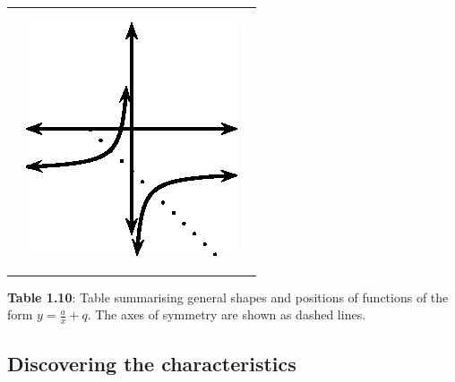\begin{center}
\begin{xtabular*}{\mytablewidth}[t]{|p{10\mystarwidth}|p{10\mystarwidth}|p{10\mystarwidth}|}
\begin{center}
    \end{center}    
                 &
    \setcounter{subfigure}{0}
\label{m39341*id246993}
    \begin{center}
    \label{m39341*id246993!!!underscore!!!media}\label{m39341*id246993!!!underscore!!!printimage}\includegraphics[width=.3\columnwidth]{col11306.imgs/m39341_MG10C11_025.png} %
      \vspace{2pt}
    \vspace{.1in}
    \end{center}    
     \tabularnewline{}
    \end{xtabular*}
      \end{center}
    \begin{center}{\small\bfseries Table 1.10}: Table summarising general shapes and positions of functions of the form $y=\frac{a}{x}+q$. The axes of symmetry are shown as dashed lines.\end{center}
    \par
\subsection{Discovering the characteristics}  
        \label{m39341*uid152}
